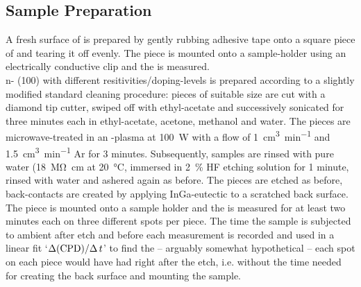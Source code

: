 \subsection{Sample Preparation}
A fresh surface of \hopg{} is prepared by gently rubbing adhesive tape onto a square piece of \hopg{} and tearing it off evenly. The piece is mounted onto a sample-holder using an electrically conductive clip and the \cpd{} is measured.\\
n-\sih{} (100) with different resitivities/doping-levels is prepared according to a slightly modified standard cleaning procedure: pieces of suitable size are cut with a diamond tip cutter, swiped off with ethyl-acetate and successively sonicated for three minutes each in ethyl-acetate, acetone, methanol and water. The pieces are microwave-treated in an \oxy{}-plasma at \SI{100}{\watt} with a flow of \SI{1}{\cubic\centi\metre\per\minute} \oxy{} and \SI{1.5}{\cubic\centi\metre\per\minute} Ar for 3 minutes. Subsequently, samples are rinsed with pure water (\SI{18}{\mega\ohm\centi\metre} at \SI{20}{\degreeCelsius}, immersed in \SI{2}{\percent} HF etching solution for 1 minute, rinsed with water and ashered again as before. The pieces are etched as before, back-contacts are created by applying InGa-eutectic to a scratched back surface. The piece is mounted onto a sample holder and the \cpd{} is measured for at least two minutes each on three different spots per piece. The time the sample is subjected to ambient after etch and before each measurement is recorded and used in a linear fit \lq{}$\Delta (\text{CPD}{})/\Delta \, t$\rq{} to find the -- arguably somewhat hypothetical -- \cpd{} each spot on each piece would have had right after the etch, i.e. without the time needed for creating the back surface and mounting the sample.\\
